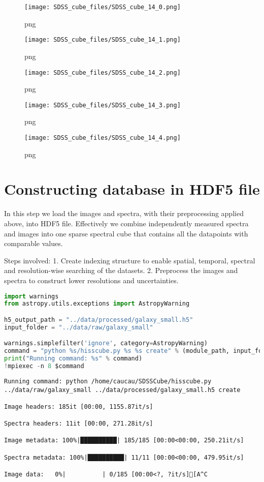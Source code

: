 \begin{figure}
\centering
\texttt{[image: SDSS\_cube\_files/SDSS\_cube\_14\_0.png]}
\caption{png}
\end{figure}

\begin{figure}
\centering
\texttt{[image: SDSS\_cube\_files/SDSS\_cube\_14\_1.png]}
\caption{png}
\end{figure}

\begin{figure}
\centering
\texttt{[image: SDSS\_cube\_files/SDSS\_cube\_14\_2.png]}
\caption{png}
\end{figure}

\begin{figure}
\centering
\texttt{[image: SDSS\_cube\_files/SDSS\_cube\_14\_3.png]}
\caption{png}
\end{figure}

\begin{figure}
\centering
\texttt{[image: SDSS\_cube\_files/SDSS\_cube\_14\_4.png]}
\caption{png}
\end{figure}

\section{Constructing database in HDF5
file}\label{constructing-database-in-hdf5-file}

In this step we load the images and spectra, with their preprocessing
applied above, into HDF5 file. Effectively we combine independently
measured spectra and images into one sparse spectral cube that contains
all the datapoints with comparable values.

Steps involved: 1. Create indexing structure to enable spatial,
temporal, spectral and resolution-wise searching of the datasets. 2.
Preprocess the images and spectra to construct lower resolutions and
uncertainties.

\begin{lstlisting}[language=Python]
import warnings
from astropy.utils.exceptions import AstropyWarning

h5_output_path = "../data/processed/galaxy_small.h5"
input_folder = "../data/raw/galaxy_small"

warnings.simplefilter('ignore', category=AstropyWarning)
command = "python %s/hisscube.py %s %s create" % (module_path, input_folder, h5_output_path)
print("Running command: %s" % command)
!mpiexec -n 8 $command
\end{lstlisting}

\begin{lstlisting}
Running command: python /home/caucau/SDSSCube/hisscube.py ../data/raw/galaxy_small ../data/processed/galaxy_small.h5 create

Image headers: 185it [00:00, 1155.87it/s]

Spectra headers: 11it [00:00, 271.28it/s]

Image metadata: 100%|██████████| 185/185 [00:00<00:00, 250.21it/s]

Spectra metadata: 100%|██████████| 11/11 [00:00<00:00, 479.95it/s]

Image data:   0%|          | 0/185 [00:00<?, ?it/s][A^C
\end{lstlisting}

